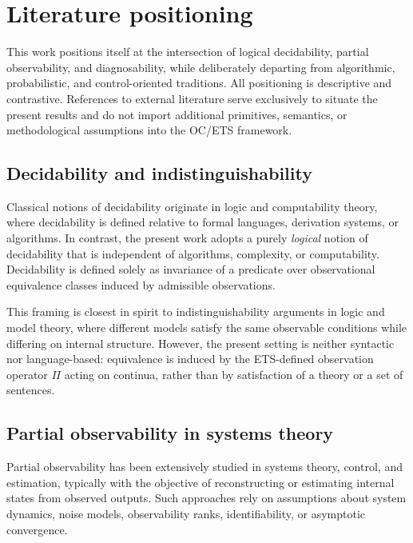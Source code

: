 \section{Literature positioning}
\label{sec:literature-positioning}

This work positions itself at the intersection of logical decidability,
partial observability, and diagnosability, while deliberately departing
from algorithmic, probabilistic, and control-oriented traditions.
All positioning is descriptive and contrastive. References to external
literature serve exclusively to situate the present results and do not
import additional primitives, semantics, or methodological assumptions
into the OC/ETS framework.

\subsection{Decidability and indistinguishability}

Classical notions of decidability originate in logic and computability
theory, where decidability is defined relative to formal languages,
derivation systems, or algorithms. In contrast, the present work adopts
a purely \emph{logical} notion of decidability that is independent of
algorithms, complexity, or computability. Decidability is defined
solely as invariance of a predicate over observational equivalence
classes induced by admissible observations.

This framing is closest in spirit to indistinguishability arguments in
logic and model theory, where different models satisfy the same
observable conditions while differing on internal structure. However,
the present setting is neither syntactic nor language-based:
equivalence is induced by the ETS-defined observation operator $\Pi$
acting on continua, rather than by satisfaction of a theory or a set of
sentences.
\cite{hodges1993_model_theory,ebbinghaus_flum1995_finite_model_theory,nerode1958_linear_automaton_transformations}

\subsection{Partial observability in systems theory}

Partial observability has been extensively studied in systems theory,
control, and estimation, typically with the objective of reconstructing
or estimating internal states from observed outputs. Such approaches
rely on assumptions about system dynamics, noise models, observability
ranks, identifiability, or asymptotic convergence.

